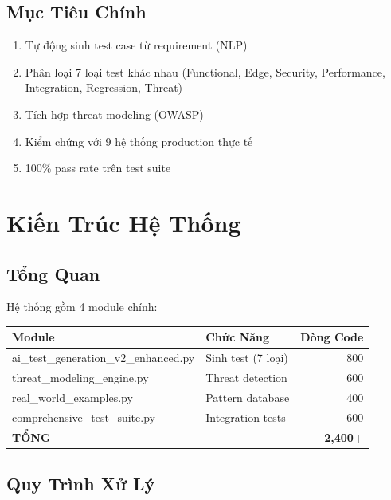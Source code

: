 \documentclass[12pt,a4paper]{report}
\begin{document}
\section{Mục Tiêu Chính}

\begin{enumerate}
    \item Tự động sinh test case từ requirement (NLP)
    \item Phân loại 7 loại test khác nhau (Functional, Edge, Security, Performance, Integration, Regression, Threat)
    \item Tích hợp threat modeling (OWASP)
    \item Kiểm chứng với 9 hệ thống production thực tế
    \item 100\% pass rate trên test suite
\end{enumerate}

\chapter{Kiến Trúc Hệ Thống}

\section{Tổng Quan}

Hệ thống gồm 4 module chính:

\begin{table}[h]
\centering
\begin{tabular}{|l|p{8cm}|r|}
\hline
\textbf{Module} & \textbf{Chức Năng} & \textbf{Dòng Code} \\
\hline
ai\_test\_generation\_v2\_enhanced.py & Sinh test (7 loại) & 800 \\
\hline
threat\_modeling\_engine.py & Threat detection & 600 \\
\hline
real\_world\_examples.py & Pattern database & 400 \\
\hline
comprehensive\_test\_suite.py & Integration tests & 600 \\
\hline
\textbf{TỔNG} & & \textbf{2,400+} \\
\hline
\end{tabular}
\end{table}

\section{Quy Trình Xử Lý}
\end{document}
